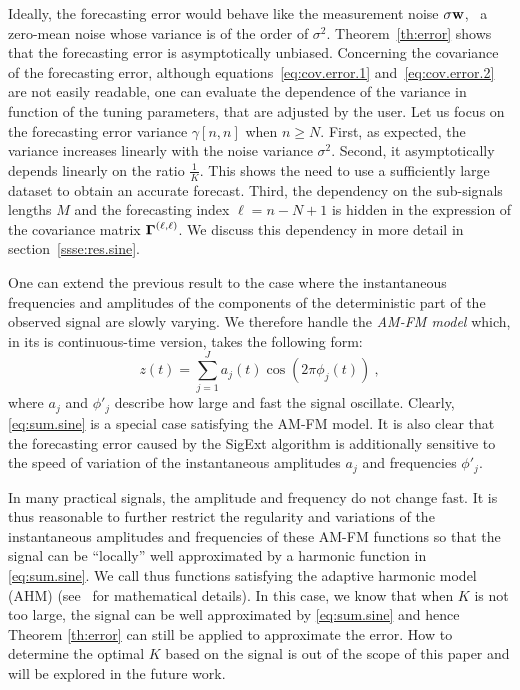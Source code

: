 Ideally, the forecasting error would behave like the measurement noise $\sigma{\mathbf w}$, \ie~a zero-mean noise whose variance is of the order of $\sigma^2$. Theorem~\ref{th:error} shows that the forecasting error is asymptotically unbiased. Concerning the covariance of the forecasting error, although equations~\eqref{eq:cov.error.1} and~\eqref{eq:cov.error.2} are not easily readable, one can evaluate the dependence of the variance in function of the tuning parameters, that are adjusted by the user. Let us focus on the forecasting error variance $\gamma[n,n]$ when $n\geq N$. First, as expected, the variance increases linearly with the noise variance $\sigma^2$. Second, it asymptotically depends linearly on the ratio $\frac{1}{K}$. This shows the need to use a sufficiently large dataset to obtain an accurate forecast. Third, the dependency on the sub-signals lengths $M$ and the forecasting index $\ell=n-N+1$ is hidden in the expression of the covariance matrix $\boldsymbol{\Gamma}^{(\ell,\ell)}$. We discuss this dependency in more detail in section~\ref{ssse:res.sine}.

\begin{remark}\label{RemarkAHM}
One can extend the previous result to the case where the instantaneous frequencies and amplitudes of the components of the deterministic part of the observed signal are slowly varying. We therefore handle the \textit{AM-FM model} which, in its is continuous-time version, takes the following form:
\begin{equation}
z(t) = \sum_{j=1}^J a_j(t)\cos(2\pi\phi_j(t))\ ,
\end{equation}
where $a_j$ and $\phi'_j$ describe how large and fast the signal oscillate. 
Clearly, \eqref{eq:sum.sine} is a special case satisfying the AM-FM model. It is also clear that the forecasting error caused by the {\sf SigExt} algorithm is additionally sensitive to the speed of variation of the instantaneous amplitudes $a_j$ and frequencies $\phi'_j$. 
%

In many practical signals, the amplitude and frequency do not change fast. It is thus reasonable to further restrict the regularity and variations of the instantaneous amplitudes and frequencies of these AM-FM functions so that the signal can be ``locally'' well approximated by a harmonic function in \eqref{eq:sum.sine}. We call thus functions satisfying the adaptive harmonic model (AHM) (see~\cite{Chen14nonparametric,Daubechies16conceft} for mathematical details). In this case, we know that when $K$ is not too large, the signal can be well approximated by \eqref{eq:sum.sine} and hence Theorem \ref{th:error} can still be applied to approximate the error. How to determine the optimal $K$ based on the signal is out of the scope of this paper and will be explored in the future work.
\end{remark}


